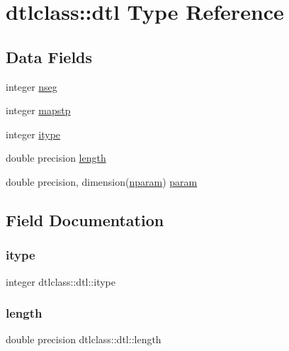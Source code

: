 \hypertarget{structdtlclass_1_1dtl}{}\section{dtlclass\+::dtl Type Reference}
\label{structdtlclass_1_1dtl}
\subsection*{Data Fields}
\begin{DoxyCompactItemize}
\item 
integer \mbox{\hyperlink{structdtlclass_1_1dtl_ab0c5195ab0993ee3107484257b94cfe5}{nseg}}
\item 
integer \mbox{\hyperlink{structdtlclass_1_1dtl_ad89c7805074fee80c05af3ae3861cb87}{mapstp}}
\item 
integer \mbox{\hyperlink{structdtlclass_1_1dtl_a75f1d8c2908cb2ac40cd24dc45a122ff}{itype}}
\item 
double precision \mbox{\hyperlink{structdtlclass_1_1dtl_ac3b7a490164af376dab82d59957bcdd3}{length}}
\item 
double precision, dimension(\mbox{\hyperlink{namespacedtlclass_adf04761c96168c3dc492c89c72194cea}{nparam}}) \mbox{\hyperlink{structdtlclass_1_1dtl_a95bc1c81e12444e39d8ea61b6e67ae34}{param}}
\end{DoxyCompactItemize}


\subsection{Field Documentation}
\mbox{\label{structdtlclass_1_1dtl_a75f1d8c2908cb2ac40cd24dc45a122ff}} 
\subsubsection{\texorpdfstring{itype}{itype}}
{\footnotesize\ttfamily integer dtlclass\+::dtl\+::itype}

\mbox{\label{structdtlclass_1_1dtl_ac3b7a490164af376dab82d59957bcdd3}} 
\subsubsection{\texorpdfstring{length}{length}}
{\footnotesize\ttfamily double precision dtlclass\+::dtl\+::length}

